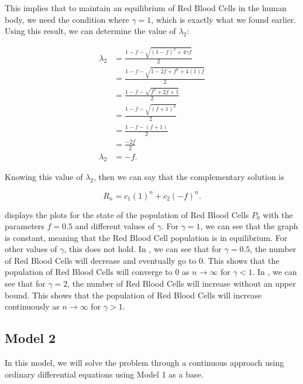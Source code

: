 This implies that to maintain an equilibrium of Red Blood Cells in the human body, we need the condition where $\gamma = 1$, which is exactly what we found earlier. Using this result, we can determine the value of $\lambda_2$:

\begin{align*}
    \lambda_2 &= \frac{1-f - \sqrt{(1-f)^2 + 4\gamma f}}{2}\\
    &= \frac{1-f - \sqrt{1-2f+f^2 + 4(1)f}}{2}\\
    &= \frac{1-f - \sqrt{f^2+2f+1}}{2}\\
    &= \frac{1-f - \sqrt{(f+1)^2}}{2}\\
    &= \frac{1-f - (f+1)}{2}\\
    &= \frac{-2f}{2}\\
    \lambda_2 &= -f.
\end{align*}

Knowing this value of $\lambda_2$, then we can say that the complementary solution is

\begin{equation} \label{eq:7}
    R_n = c_1(1)^n + c_2(-f)^n.
\end{equation}


 displays the plots for the state of the population of Red Blood Cells $P_0$ with the parameters $f=0.5$ and different values of $\gamma$. For $\gamma=1$, we can see that the graph is constant, meaning that the Red Blood Cell population is in equilibrium. For other values of $\gamma$, this does not hold. In , we can see that for $\gamma = 0.5$, the number of Red Blood Cells will decrease and eventually go to 0. This shows that the population of Red Blood Cells will converge to 0 as $n\to\infty$ for $\gamma < 1$. In , we can see that for $\gamma = 2$, the number of Red Blood Cells will increase without an upper bound. This shows that the population of Red Blood Cells will increase continuously as $n\to\infty$ for $\gamma > 1$.

\subsection{Model 2}
\label{subsec:model-2}

In this model, we will solve the problem through a continuous approach using ordinary differential equations using Model 1 as a base.

